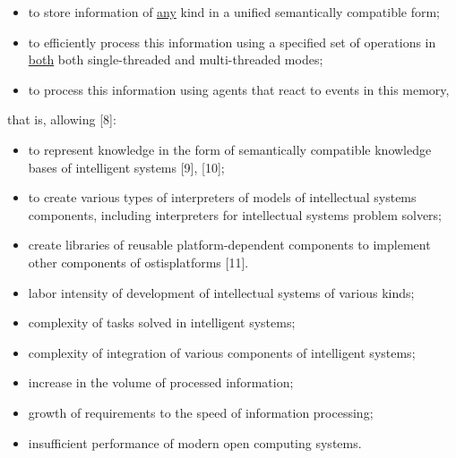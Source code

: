 \documentclass{article}
\begin{document}
\begin{multicols}{2}
\begin{itemize}
   \item to store information of \underline{any} kind in a unified semantically compatible form; 
   \item to efficiently process this information using a specified set of operations in \underline{both} both single-threaded and
multi-threaded modes;
    \item to process this information using agents that react
to events in this memory,

\end{itemize}
that is, allowing [8]:
\begin{itemize}

\item to represent knowledge in the form of semantically
compatible knowledge bases of intelligent systems
[9], [10];
\item to create various types of interpreters of models
of intellectual systems components, including interpreters for intellectual systems problem solvers;
\item create libraries of reusable platform-dependent components to implement other components of ostisplatforms [11].

\end{itemize}
\begin{itemize}
\item labor intensity of development of intellectual systems of various kinds; 
\item complexity of tasks solved in intelligent systems;
\item complexity of integration of various components of
intelligent systems;

\item increase in the volume of processed information;

\item growth of requirements to the speed of information
processing;
\item insufficient performance of modern open computing
systems.


\end{itemize}
\par
\begin{center}

\end{center}
\end{multicols}
\end{document}
